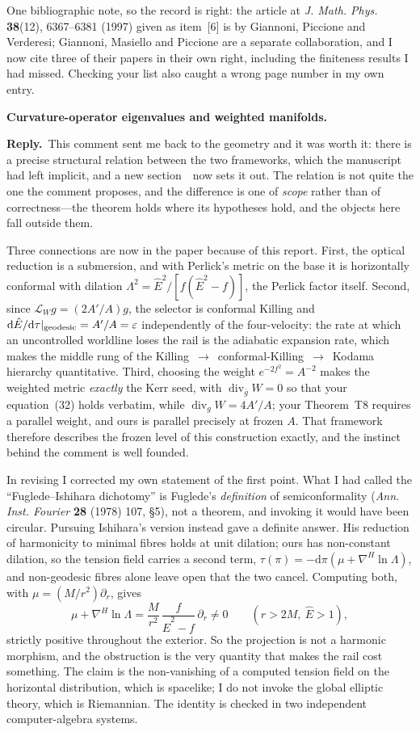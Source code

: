 \documentclass[11pt]{article}
\newcommand{\reply}{\par\noindent\textbf{Reply.}\ }
\newcommand{\dd}{\mathrm{d}}
\newcommand{\R}[1]{\par\medskip\noindent\textbf{#1}\par\nopagebreak}
\begin{document}
One bibliographic note, so the record is right: the article at \emph{J. Math. Phys.}
\textbf{38}(12), 6367--6381 (1997) given as item~[6] is by Giannoni, Piccione and
Verderesi; Giannoni, Masiello and Piccione are a separate collaboration, and I now
cite three of their papers in their own right, including the finiteness results I had
missed. Checking your list also caught a wrong page number in my own entry.

\R{Curvature-operator eigenvalues and weighted manifolds.}
\reply This comment sent me back to the geometry and it was worth it: there is a
precise structural relation between the two frameworks, which the manuscript had left
implicit, and a new section~\msSecSubmersion\ now sets it out. The relation is not
quite the one the comment proposes, and the difference is one of \emph{scope} rather
than of correctness---the theorem holds where its hypotheses hold, and the objects
here fall outside them.

Three connections are now in the paper because of this report. First, the optical
reduction is a submersion, and with Perlick's metric on the base it is horizontally
conformal with dilation $\Lambda^2=\hat E^2/[f(\hat E^2-f)]$, the Perlick factor
itself. Second, since $\mathcal L_Wg=(2A'/A)g$, the selector is conformal Killing
and $\dd\hat E/\dd\tau|_{\rm geodesic}=A'/A=\varepsilon$ independently of the
four-velocity: the rate at which an uncontrolled worldline loses the rail is the
adiabatic expansion rate, which makes the middle rung of the
Killing~$\to$~conformal-Killing~$\to$~Kodama hierarchy quantitative. Third, choosing
the weight $e^{-2f^2}=A^{-2}$ makes the weighted metric \emph{exactly} the Kerr seed,
with $\operatorname{div}_{\bar g}W=0$ so that your equation~(32) holds verbatim,
while $\operatorname{div}_gW=4A'/A$; your Theorem~T8 requires a parallel weight, and
ours is parallel precisely at frozen $A$. That framework therefore describes the
frozen level of this construction exactly, and the instinct behind the comment is
well founded.

In revising I corrected my own statement of the first point. What I had called the
``Fuglede--Ishihara dichotomy'' is Fuglede's \emph{definition} of semiconformality
(\emph{Ann. Inst. Fourier} \textbf{28} (1978) 107, \S5), not a theorem, and invoking it
would have been circular. Pursuing Ishihara's version instead gave a definite answer.
His reduction of harmonicity to minimal fibres holds at unit dilation; ours has
non-constant dilation, so the tension field carries a second term,
$\tau(\pi)=-\dd\pi(\mu+\nabla^H\ln\Lambda)$, and non-geodesic fibres alone leave open
that the two cancel. Computing both, with $\mu=(M/r^2)\partial_r$, gives
\[
   \mu+\nabla^H\ln\Lambda=\frac{M}{r^2}\,\frac{f}{\hat E^2-f}\,\partial_r\neq0
   \qquad(r>2M,\ \hat E>1),
\]
strictly positive throughout the exterior. So the projection is not a harmonic
morphism, and the obstruction is the very quantity that makes the rail cost
something. The claim is the non-vanishing of a computed tension field on the
horizontal distribution, which is spacelike; I do not invoke the global elliptic
theory, which is Riemannian. The identity is checked in two independent
computer-algebra systems.
\end{document}
